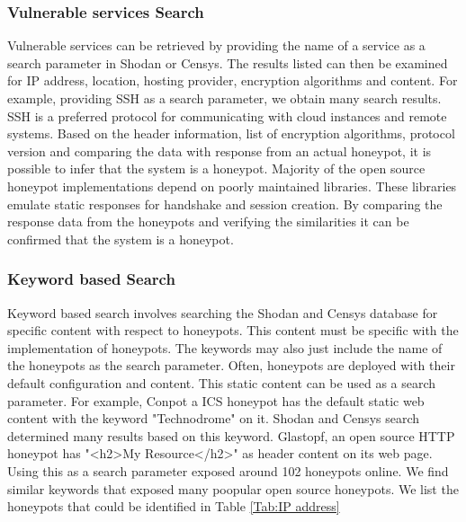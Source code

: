 \documentclass[../main.tex]{subfiles}
\begin{document}
 \subsubsection{Vulnerable services Search}
 Vulnerable services can be retrieved by providing the name of a service as a search parameter in Shodan or Censys. The results listed can then be examined for IP address, location, hosting provider, encryption algorithms and content. For example, providing SSH as a search parameter, we obtain many search results. SSH is a preferred protocol for communicating with cloud instances and remote systems. Based on the header information, list of encryption algorithms, protocol version and comparing the data with response from an actual honeypot, it is possible to infer that the system is a honeypot. Majority of the open source honeypot implementations depend on poorly maintained libraries. These libraries emulate static responses for handshake and session creation. By comparing the response data from the honeypots and verifying the similarities it can be confirmed that the system is a honeypot. 
 
 \subsubsection{Keyword based Search}
Keyword based search involves searching the Shodan and Censys database for specific content with respect to honeypots. This content must be specific with the implementation of honeypots. The keywords may also just include the name of the honeypots as the search parameter. Often, honeypots are deployed with their default configuration and content. This static content can be used as a search parameter. For example, Conpot a ICS honeypot has the default static web content with the keyword "Technodrome" on it. Shodan and Censys search determined many results based on this keyword. Glastopf, an open source HTTP honeypot has "<h2>My Resource</h2>" as header content on its web page. Using this as a search parameter exposed around 102 honeypots online. We find similar keywords that exposed many poopular open source honeypots. We list the honeypots that could be identified in Table \ref{Tab:IP address}
\end{document}
